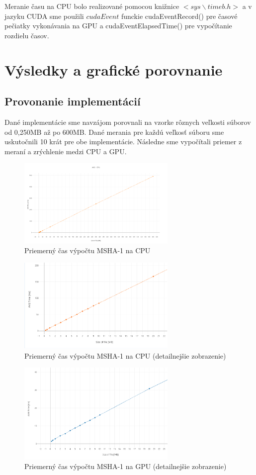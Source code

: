 \documentclass[conference]{IEEEtran}
\begin{document}
Meranie času na CPU bolo realizované pomocou knižnice ${<sys\backslash timeb.h>}$ a v jazyku CUDA sme použili ${cudaEvent}$ funckie cudaEventRecord() pre časové pečiatky vykonávania na GPU a cudaEventElapsedTime() pre vypočítanie rozdielu časov. 


\section{Výsledky a grafické porovnanie}

\subsection{Provonanie implementácií}
Dané implementácie sme navzájom porovnali na vzorke rôznych veľkosti súborov od 0,250MB až po 600MB. Dané merania pre každú veľkosť súboru sme uskutočnili 10 krát pre obe implementácie. Následne sme vypočítali priemer z meraní a zrýchlenie medzi CPU a GPU. 

\begin{figure}[h!]
\centering
\includegraphics[width=3in]{img/AVG-CPU-new}
\caption{Priemerný čas výpočtu MSHA-1 na CPU}
\end{figure}

\begin{figure}[h!]
\centering
\includegraphics[width=3in]{img/AVG-CPU-new2}
\caption{Priemerný čas výpočtu MSHA-1 na CPU  (detailnejšie zobrazenie)}
\end{figure}


\begin{figure}[h!]
\centering
\includegraphics[width=3in]{img/AVG-GPU-new3}
\caption{Priemerný čas výpočtu MSHA-1 na GPU (detailnejšie zobrazenie)}
\end{figure}
\end{document}
